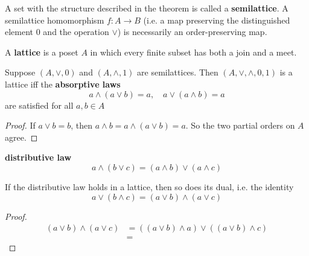 \documentclass[11pt]{article}
\begin{document}
A set with the structure described in the theorem is called a \textbf{semilattice}. A
semilattice homomorphism \(f:A\to B\) (i.e. a map preserving the
distinguished element 0 and the operation \(\vee\)) is necessarily an
order-preserving map.

A \textbf{lattice} is a poset \(A\) in which every finite subset has both a join and a
meet.

\begin{proposition}[]
Suppose \((A,\vee,0)\) and \((A,\wedge,1)\) are semilattices. Then
\((A,\vee,\wedge,0,1)\) is a lattice iff the \textbf{absorptive laws}
\begin{equation*}
a\wedge(a\vee b)=a,\quad a\vee(a\wedge b)=a
\end{equation*}
are satisfied for all \(a,b\in A\)
\end{proposition}

\begin{proof}
If \(a\vee b=b\), then \(a\wedge b=a\wedge(a\vee b)=a\). So the two partial
orders on \(A\) agree.
\end{proof}

\textbf{distributive law}
\begin{equation*}
a\wedge(b\vee c)=(a\wedge b)\vee(a\wedge c)
\end{equation*}

\begin{lemma}[]
If the distributive law holds in a lattice, then so does its dual, i.e. the
identity
\begin{equation*}
a\vee(b\wedge c)=(a\vee b)\wedge(a\vee c)
\end{equation*}
\end{lemma}

\begin{proof}
\begin{align*}
(a\vee b)\wedge(a\vee c)&=
((a\vee b)\wedge a)\vee((a\vee b)\wedge c)\\
&=
\end{align*}
\end{proof}
\end{document}
